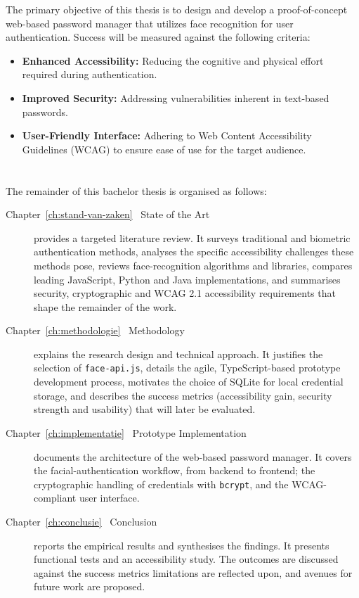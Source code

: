 The primary objective of this thesis is to design and develop a proof-of-concept web-based password manager that utilizes face recognition for user authentication. Success will be measured against the following criteria:
\begin{itemize}
  \item \textbf{Enhanced Accessibility:} Reducing the cognitive and physical effort required during authentication.
  \item \textbf{Improved Security:} Addressing vulnerabilities inherent in text-based passwords.
  \item \textbf{User-Friendly Interface:} Adhering to Web Content Accessibility Guidelines (WCAG) to ensure ease of use for the target audience.
\end{itemize}

\section{}
\label{sec:opzet-bachelorproef}

The remainder of this bachelor thesis is organised as follows:

\begin{description}
  \item[Chapter~\ref{ch:stand-van-zaken} \textemdash\ State of the Art] provides a targeted literature review.  
        It surveys traditional and biometric authentication methods,  
        analyses the specific accessibility challenges these methods pose,  
        reviews face-recognition algorithms and libraries,  
        compares leading JavaScript, Python and Java implementations, and  
        summarises security, cryptographic and WCAG 2.1 accessibility requirements that shape the remainder of the work.

  \item[Chapter~\ref{ch:methodologie} \textemdash\ Methodology] explains the research design and technical approach.  
        It justifies the selection of \texttt{face-api.js}, details the agile, TypeScript-based prototype development process, motivates the choice of SQLite for local credential storage, and describes the success metrics (accessibility gain, security strength and usability) that will later be evaluated.

  \item[Chapter~\ref{ch:implementatie} \textemdash\ Prototype Implementation] documents the architecture of the web-based password manager.  
        It covers the facial-authentication workflow, from backend to frontend; the cryptographic handling of credentials with \texttt{bcrypt}, and the WCAG-compliant user interface.

  \item[Chapter~\ref{ch:conclusie} \textemdash\ Conclusion] reports the empirical results and synthesises the findings. 
        It presents functional tests and an accessibility study. The outcomes are discussed against the success metrics limitations are reflected upon, and avenues for future work are proposed.
\end{description}
